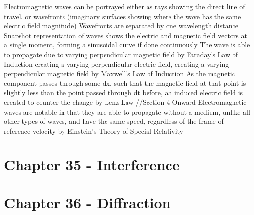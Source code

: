 \documentclass[11 pt, twoside]{article}
\newenvironment{outline*}
{
	\begin{outline}[enumerate]
	}
	{\end{outline}
}
\begin{document}
\begin{outline*}
\1 Electromagnetic waves can be portrayed either as rays showing the direct line of travel, or wavefronts (imaginary surfaces showing where the wave has the same electric field magnitude)
\2 Wavefronts are separated by one wavelength distance
\2 Snapshot representation of waves shows the electric and magnetic field vectors at a single moment, forming a sinusoidal curve if done continuously
\1 The wave is able to propagate due to varying perpendicular magnetic field by Faraday's Law of  Induction creating a varying perpendicular electric field, creating a varying perpendicular magnetic field by Maxwell's Law of Induction
\2 As the magnetic component passes through some dx, such that the magnetic field at that point is slightly less than the point passed through dt before, an induced electric field is created to counter the change by Lenz Law
\2 //Section 4 Onward 
\1 Electromagnetic waves are notable in that they are able to propagate without a medium, unlike all other types of waves, and have the same speed, regardless of the frame of reference velocity by Einstein's Theory of Special Relativity
\end{outline*}
\section{Chapter 35 - Interference}
\begin{outline*}

\end{outline*}
\section{Chapter 36 - Diffraction}
\begin{outline*}

\end{outline*}
\end{document}
